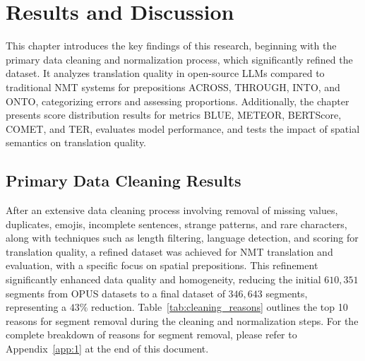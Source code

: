 \chapter{Results and Discussion}
\label{cap:Resultados}

This chapter introduces the key findings of this research, beginning with the primary data cleaning and normalization process, which significantly refined the dataset. It analyzes translation quality in open-source LLMs compared to traditional NMT systems for prepositions ACROSS, THROUGH, INTO, and ONTO, categorizing errors and assessing proportions. Additionally, the chapter presents score distribution results for metrics BLUE, METEOR, BERTScore, COMET, and TER, evaluates model performance, and tests the impact of spatial semantics on translation quality. 


\section{Primary Data Cleaning Results}

After an extensive data cleaning process involving removal of missing values, duplicates, emojis, incomplete sentences, strange patterns, and rare characters, along with techniques such as length filtering, language detection, and scoring for translation quality, a refined dataset was achieved for NMT translation and evaluation, with a specific focus on spatial prepositions. This refinement significantly enhanced data quality and homogeneity, reducing the initial $610,351$ segments from OPUS datasets to a final dataset of $346,643$ segments, representing a $43\%$ reduction. Table~\ref{tab:cleaning_reasons} outlines the top 10 reasons for segment removal during the cleaning and normalization steps. For the complete breakdown of reasons for segment removal, please refer to Appendix~\ref{app:1} at the end of this document.

